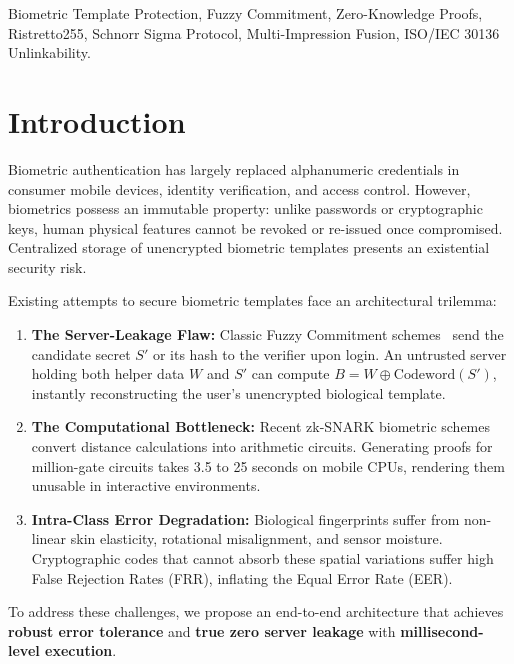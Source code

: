 \documentclass[conference]{IEEEtran}
\begin{document}
\begin{IEEEkeywords}
Biometric Template Protection, Fuzzy Commitment, Zero-Knowledge Proofs, Ristretto255, Schnorr Sigma Protocol, Multi-Impression Fusion, ISO/IEC 30136 Unlinkability.
\end{IEEEkeywords}

\section{Introduction}
Biometric authentication has largely replaced alphanumeric credentials in consumer mobile devices, identity verification, and access control. However, biometrics possess an immutable property: unlike passwords or cryptographic keys, human physical features cannot be revoked or re-issued once compromised. Centralized storage of unencrypted biometric templates presents an existential security risk.

Existing attempts to secure biometric templates face an architectural trilemma:
\begin{enumerate}
    \item \textbf{The Server-Leakage Flaw:} Classic Fuzzy Commitment schemes~\cite{juels1999fuzzy} send the candidate secret $S'$ or its hash to the verifier upon login. An untrusted server holding both helper data $W$ and $S'$ can compute $B = W \oplus \text{Codeword}(S')$, instantly reconstructing the user's unencrypted biological template.
    \item \textbf{The Computational Bottleneck:} Recent zk-SNARK biometric schemes~\cite{zkbiometrics2024} convert distance calculations into arithmetic circuits. Generating proofs for million-gate circuits takes 3.5 to 25 seconds on mobile CPUs, rendering them unusable in interactive environments.
    \item \textbf{Intra-Class Error Degradation:} Biological fingerprints suffer from non-linear skin elasticity, rotational misalignment, and sensor moisture. Cryptographic codes that cannot absorb these spatial variations suffer high False Rejection Rates (FRR), inflating the Equal Error Rate (EER).
\end{enumerate}

To address these challenges, we propose an end-to-end architecture that achieves \textbf{robust error tolerance} and \textbf{true zero server leakage} with \textbf{millisecond-level execution}.
\end{document}
